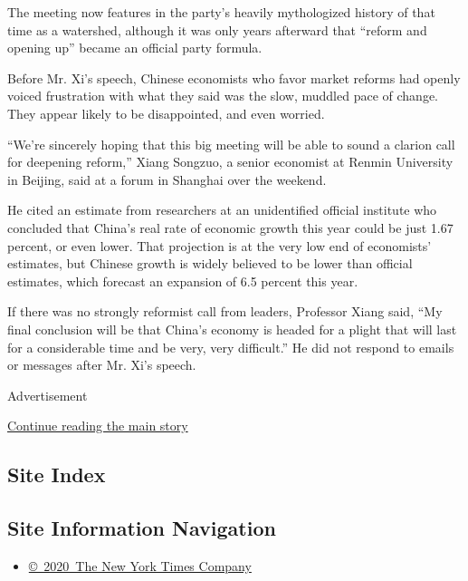 The meeting now features in the party's heavily mythologized history of
that time as a watershed, although it was only years afterward that
``reform and opening up'' became an official party formula.

Before Mr. Xi's speech, Chinese economists who favor market reforms had
openly voiced frustration with what they said was the slow, muddled pace
of change. They appear likely to be disappointed, and even worried.

``We're sincerely hoping that this big meeting will be able to sound a
clarion call for deepening reform,'' Xiang Songzuo, a senior economist
at Renmin University in Beijing, said at a forum in Shanghai over the
weekend.

He cited an estimate from researchers at an unidentified official
institute who concluded that China's real rate of economic growth this
year could be just 1.67 percent, or even lower. That projection is at
the very low end of economists' estimates, but Chinese growth is widely
believed to be lower than official estimates, which forecast an
expansion of 6.5 percent this year.

If there was no strongly reformist call from leaders, Professor Xiang
said, ``My final conclusion will be that China's economy is headed for a
plight that will last for a considerable time and be very, very
difficult.'' He did not respond to emails or messages after Mr. Xi's
speech.

Advertisement

\protect\hyperlink{after-bottom}{Continue reading the main story}

\hypertarget{site-index}{%
\subsection{Site Index}\label{site-index}}

\hypertarget{site-information-navigation}{%
\subsection{Site Information
Navigation}\label{site-information-navigation}}

\begin{itemize}
\tightlist
\item
  \href{https://help.nytimes3xbfgragh.onion/hc/en-us/articles/115014792127-Copyright-notice}{©~2020~The
  New York Times Company}
\end{itemize}

